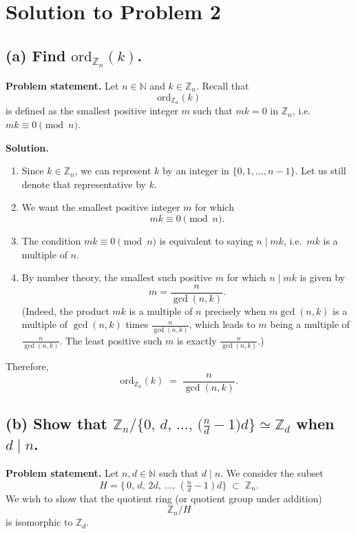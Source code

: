 \documentclass[12pt]{article}
\theoremstyle{definition} %
\theoremstyle{plain} %
\begin{document}
  \section*{Solution to Problem 2}

\subsection*{(a) Find $\mathrm{ord}_{\mathbb{Z}_n}(k)$.}

\textbf{Problem statement.} Let $n \in \mathbb{N}$ and $k \in \mathbb{Z}_n$. Recall that
\[
 \mathrm{ord}_{\mathbb{Z}_n}(k)
\]
is defined as the smallest positive integer $m$ such that $mk = 0$ in $\mathbb{Z}_n$, i.e.\ $mk \equiv 0 \pmod{n}$.
 
\textbf{Solution.}

\begin{enumerate}
  \item Since $k \in \mathbb{Z}_n$, we can represent $k$ by an integer in $\{0,1,\dots,n-1\}$. Let us still denote that representative by $k$.
  \item We want the smallest positive integer $m$ for which
  \[
    mk \equiv 0 \pmod{n}.
  \]
  \item The condition $mk \equiv 0 \pmod{n}$ is equivalent to saying $n \mid mk$, i.e.\ $mk$ is a multiple of $n$.
  \item By number theory, the smallest such positive $m$ for which $n \mid mk$ is given by
  \[
    m = \frac{n}{\gcd(n,k)}.
  \]
  (Indeed, the product $mk$ is a multiple of $n$ precisely when $m \gcd(n,k)$ is a multiple of $\gcd(n,k)$ times $\frac{n}{\gcd(n,k)}$, which leads to $m$ being a multiple of $\frac{n}{\gcd(n,k)}$. The least positive such $m$ is exactly $\frac{n}{\gcd(n,k)}$.)
\end{enumerate}

Therefore,
\[
  \mathrm{ord}_{\mathbb{Z}_n}(k) \;=\; \frac{n}{\gcd(n,k)}.
\]

\subsection*{(b) Show that $\mathbb{Z}_n / \{0,\, d,\, \ldots,\, \bigl(\tfrac{n}{d}-1\bigr)d\} \simeq \mathbb{Z}_d$ when $d \mid n$.}

\textbf{Problem statement.} Let $n,d \in \mathbb{N}$ such that $d \mid n$. We consider the subset
\[
  H = \{\,0,\, d,\, 2d,\, \ldots,\,(\tfrac{n}{d}-1)d \} \;\subset\; \mathbb{Z}_n.
\]
We wish to show that the quotient ring (or quotient group under addition)
\[
  \mathbb{Z}_n / H
\]
is isomorphic to $\mathbb{Z}_d$.
\end{document}
